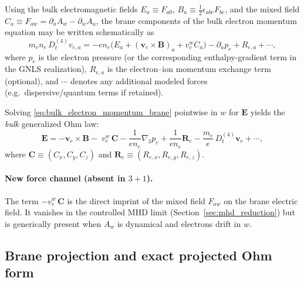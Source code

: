 \documentclass[11pt]{article}
\newcommand{\gradthree}{\nabla_3}
\begin{document}
Using the bulk electromagnetic fields
\(
E_a\equiv F_{a0}
\),
\(
B_a\equiv \tfrac12\epsilon_{abc}F_{bc}
\),
and the mixed field
\(
C_a\equiv F_{aw}=\partial_a A_w-\partial_w A_a
\),
the brane components of the bulk electron momentum equation may be written schematically as
\begin{equation}
m_e n_e\,D_t^{(4)} v_{e,a}
=
-e n_e\Big(E_a + (\mathbf{v}_e\times\mathbf{B})_a + v_e^w C_a\Big)
-\partial_a p_e
+R_{e,a}
+\cdots,
\label{eq:bulk_electron_momentum_brane}
\end{equation}
where \(p_e\) is the electron pressure (or the corresponding enthalpy-gradient term in the
GNLS realization), \(R_{e,a}\) is the electron--ion momentum exchange term (optional), and
\(\cdots\) denotes any additional modeled forces (e.g.\ dispersive/quantum terms if retained).

Solving \eqref{eq:bulk_electron_momentum_brane} pointwise in \(w\) for \(\mathbf{E}\) yields the
\emph{bulk} generalized Ohm law:
\begin{equation}
\mathbf{E}
=
-\mathbf{v}_e\times\mathbf{B}
-\;v_e^w\,\mathbf{C}
-\frac{1}{e n_e}\gradthree p_e
+\frac{1}{e n_e}\mathbf{R}_e
-\frac{m_e}{e}\,D_t^{(4)}\mathbf{v}_e
+\cdots,
\label{eq:ohm_bulk_pointwise}
\end{equation}
where \(\mathbf{C}\equiv (C_x,C_y,C_z)\) and \(\mathbf{R}_e\equiv (R_{e,x},R_{e,y},R_{e,z})\).

\paragraph{New force channel (absent in \(3+1\)).}
The term \(-v_e^w\,\mathbf{C}\) is the direct imprint of the mixed field \(F_{aw}\) on the
brane electric field. It vanishes in the controlled MHD limit
(Section~\ref{sec:mhd_reduction}) but is generically present when \(A_w\) is dynamical and
electrons drift in \(w\).

\subsection{Brane projection and exact projected Ohm form}
\label{subsec:ohm_projected_exact}
\end{document}
